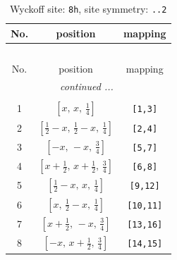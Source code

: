 \documentclass[fleqn,8pt]{jsarticle}
\begin{document}
\begin{longtable}{ccc}
\caption{Wyckoff site: {\tt 8h}, site symmetry: {\tt ..2}}
 \\
 \hline \hline
No. & position & mapping \\ \hline \endfirsthead

\multicolumn{2}{l}{\tablename\ \thetable{}} \\
 \hline \hline
No. & position & mapping \\ \hline \endhead

 \hline \hline
\multicolumn{2}{r}{\footnotesize\it continued ...} \\ \endfoot

 \hline \hline
\multicolumn{2}{r}{} \\ \endlastfoot

1 & $\left[ x,\, x,\, \frac{1}{4} \right]$ & {\tt [1,3]} \\ \hline
2 & $\left[ \frac{1}{2} - x,\, \frac{1}{2} - x,\, \frac{1}{4} \right]$ & {\tt [2,4]} \\ \hline
3 & $\left[ - x,\, - x,\, \frac{3}{4} \right]$ & {\tt [5,7]} \\ \hline
4 & $\left[ x + \frac{1}{2},\, x + \frac{1}{2},\, \frac{3}{4} \right]$ & {\tt [6,8]} \\ \hline
5 & $\left[ \frac{1}{2} - x,\, x,\, \frac{1}{4} \right]$ & {\tt [9,12]} \\ \hline
6 & $\left[ x,\, \frac{1}{2} - x,\, \frac{1}{4} \right]$ & {\tt [10,11]} \\ \hline
7 & $\left[ x + \frac{1}{2},\, - x,\, \frac{3}{4} \right]$ & {\tt [13,16]} \\ \hline
8 & $\left[ - x,\, x + \frac{1}{2},\, \frac{3}{4} \right]$ & {\tt [14,15]} \\
\end{longtable}
\renewcommand{\arraystretch}{1.2}
\end{document}
